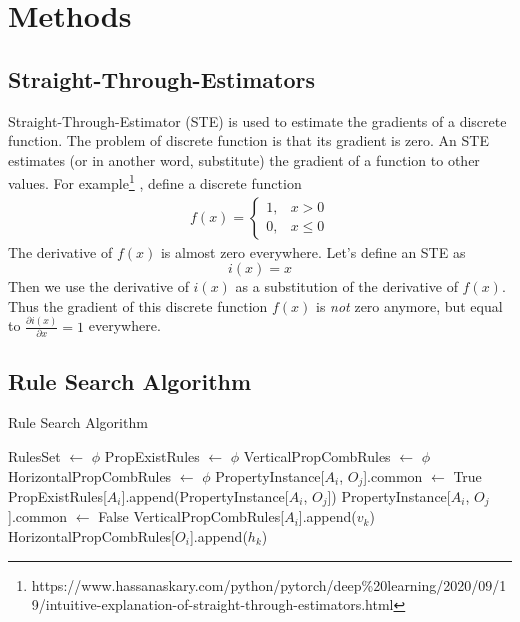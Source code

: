 \chapter{Methods}

\section{Straight-Through-Estimators}
Straight-Through-Estimator (STE)\cite{STE} is used to estimate the gradients of a discrete function. The problem of discrete function is that its gradient is zero.
An STE estimates (or in another word, substitute)  the gradient of a function to other values. For example\footnote{https://www.hassanaskary.com/python/pytorch/deep\%20learning/2020/09/19/intuitive-explanation-of-straight-through-estimators.html}
, define a discrete function 
\begin{equation}
	\begin{split}
		f(x) = \begin{cases}
			1, & x > 0\\
			0, & x\le 0
		\end{cases}
	\end{split}
\end{equation}
The derivative of $ f(x) $ is almost zero everywhere. Let's define an STE as
\[ i(x) = x \]
Then we use the derivative of $ i(x) $ as a substitution of the derivative of $ f(x) $. Thus the gradient of this discrete function $ f(x) $ is \textit{not} zero anymore, but equal to $ \frac{\partial i(x)}{\partial x} = 1 $ everywhere. 


\section{Rule Search Algorithm}
\begin{algorithm}
	\caption{Rule Search Algorithm} 
	\begin{algorithmic}[1]
		\State RulesSet $ \leftarrow $ $\phi$
		\State PropExistRules $ \leftarrow $ $\phi$
		\State VerticalPropCombRules $ \leftarrow $ $\phi$
		\State HorizontalPropCombRules $ \leftarrow $ $\phi$
						\State  PropertyInstance[$ A_i $, $ O_j $].common $ \leftarrow $ True
						\State PropExistRules[$ A_i $].append(PropertyInstance[$ A_i $, $ O_j $])
					\Else
						\State PropertyInstance[$ A_i $, $ O_j $].common  $\leftarrow $ False
					\EndIf
				\EndFor
						\State VerticalPropCombRules[$ A_i $].append($ v_k $)
					\EndIf
				\EndFor
			\EndFor
		\EndFor
					\State HorizontalPropCombRules[$ O_i $].append($ h_k $)
				\EndIf
			\EndFor
		\EndFor 
		
	\end{algorithmic} 
\end{algorithm}




